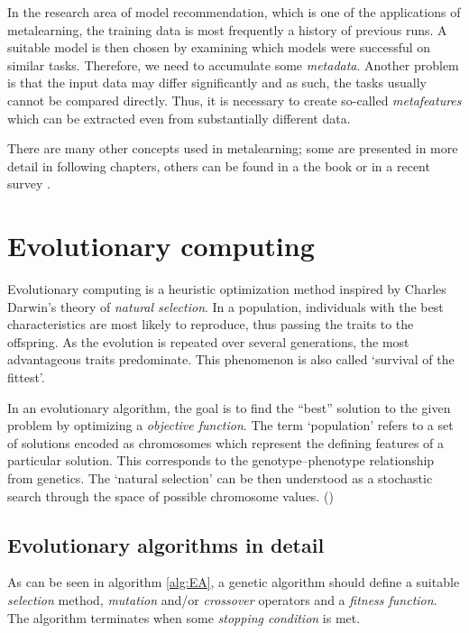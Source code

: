 In the research area of model recommendation, which is one of the applications
of metalearning, the training data is most
frequently a history of previous runs. A suitable model is then chosen by
examining which models were successful on similar tasks.
Therefore, we need to accumulate some \emph{metadata}. Another problem
is that the input data may differ significantly and as such, the tasks usually
cannot be compared directly. Thus, it is necessary to create so-called
\emph{metafeatures} which can be extracted even from substantially different
data.

There are many other concepts used in metalearning; some are presented in more
detail in following chapters, others can be found in a the book
\citep{Brazdil:2008:MAD:1507541} or in a recent survey
\citep{DBLP:journals/corr/abs-1810-03548}.

\section{Evolutionary computing} \label{ea}
Evolutionary computing is a heuristic optimization method inspired by 
Charles Darwin's theory of \emph{natural selection}. \cite{darwin} In 
a population, individuals with the best characteristics are most likely
to reproduce, thus passing the traits to the offspring. As the 
evolution is repeated over several generations, the most advantageous traits 
predominate. This phenomenon is also called `survival of the fittest'.

In an evolutionary algorithm, the goal is to find the ``best'' solution 
to the given problem by optimizing a \emph{objective function}. The term
`population' refers to a set of solutions encoded as chromosomes which 
represent the defining features of a particular solution. This corresponds
to the genotype--phenotype relationship from genetics. The `natural selection'
can be then understood as a stochastic search through the space of possible 
chromosome values. 
(\cite{Engelbrecht:2007:CII:1557464})

\subsection{Evolutionary algorithms in detail}
As can be seen in algorithm \ref{alg:EA}, a genetic algorithm should 
define a suitable \emph{selection} method, \emph{mutation} and/or 
\emph{crossover} operators and a \emph{fitness function}.
The algorithm terminates when some \emph{stopping condition} is met. 

